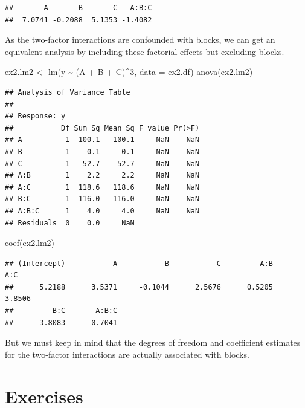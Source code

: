 \documentclass[
]{book}
\newenvironment{Shaded}{\begin{snugshade}}{\end{snugshade}}
\newcommand{\AttributeTok}[1]{\textcolor[rgb]{0.77,0.63,0.00}{#1}}
\newcommand{\DecValTok}[1]{\textcolor[rgb]{0.00,0.00,0.81}{#1}}
\newcommand{\FunctionTok}[1]{\textcolor[rgb]{0.00,0.00,0.00}{#1}}
\newcommand{\NormalTok}[1]{#1}
\newcommand{\OtherTok}[1]{\textcolor[rgb]{0.56,0.35,0.01}{#1}}
\newcommand{\SpecialCharTok}[1]{\textcolor[rgb]{0.00,0.00,0.00}{#1}}
\theoremstyle{definition}
\theoremstyle{definition}
\theoremstyle{definition}
\theoremstyle{definition}
\theoremstyle{remark}
\begin{document}
\begin{verbatim}
##       A       B       C   A:B:C 
##  7.0741 -0.2088  5.1353 -1.4082
\end{verbatim}

As the two-factor interactions are confounded with blocks, we can get an equivalent analysis by including these factorial effects but excluding blocks.

\begin{Shaded}
\begin{Highlighting}[]
\NormalTok{ex2.lm2 }\OtherTok{\textless{}{-}} \FunctionTok{lm}\NormalTok{(y }\SpecialCharTok{\textasciitilde{}}\NormalTok{  (A }\SpecialCharTok{+}\NormalTok{ B }\SpecialCharTok{+}\NormalTok{ C)}\SpecialCharTok{\^{}}\DecValTok{3}\NormalTok{, }\AttributeTok{data =}\NormalTok{ ex2.df)}
\FunctionTok{anova}\NormalTok{(ex2.lm2)}
\end{Highlighting}
\end{Shaded}

\begin{verbatim}
## Analysis of Variance Table
## 
## Response: y
##           Df Sum Sq Mean Sq F value Pr(>F)
## A          1  100.1   100.1     NaN    NaN
## B          1    0.1     0.1     NaN    NaN
## C          1   52.7    52.7     NaN    NaN
## A:B        1    2.2     2.2     NaN    NaN
## A:C        1  118.6   118.6     NaN    NaN
## B:C        1  116.0   116.0     NaN    NaN
## A:B:C      1    4.0     4.0     NaN    NaN
## Residuals  0    0.0     NaN
\end{verbatim}

\begin{Shaded}
\begin{Highlighting}[]
\FunctionTok{coef}\NormalTok{(ex2.lm2)}
\end{Highlighting}
\end{Shaded}

\begin{verbatim}
## (Intercept)           A           B           C         A:B         A:C 
##      5.2188      3.5371     -0.1044      2.5676      0.5205      3.8506 
##         B:C       A:B:C 
##      3.8083     -0.7041
\end{verbatim}

But we must keep in mind that the degrees of freedom and coefficient estimates for the two-factor interactions are actually associated with blocks.

\hypertarget{exercises-3}{%
\section{Exercises}\label{exercises-3}}
\end{document}
